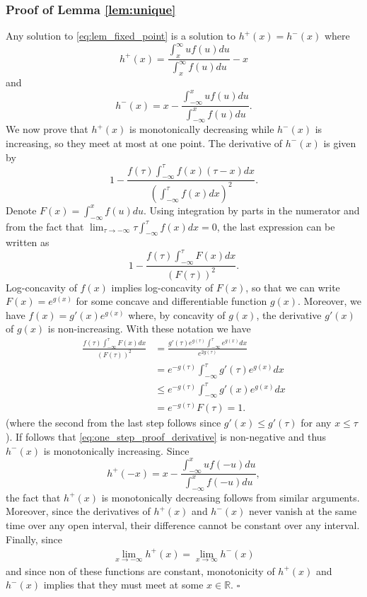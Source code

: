 \documentclass[letterpaper, conference]{IEEEtran}      %
\newcommand*{\QEDA}{\hfill\ensuremath{\square}}
\begin{document}
\subsubsection*{Proof of Lemma \ref{lem:unique}} 
Any solution to \eqref{eq:lem_fixed_point} is a solution to $h^+(x) = h^-(x)$ where
\[
h^+(x) = \frac{\int_x^\infty uf(u)du}{\int_x^\infty f(u)du} - x 
\]
and
\[
h^-(x) = x - \frac{\int_{-\infty}^x uf(u)du}{\int_{-\infty}^x f(u)du}.
\]
We now prove that $h^+(x)$ is monotonically decreasing while $h^-(x)$ is increasing, so they meet at most at one point. The derivative of $h^-(x)$ is given by
\begin{equation} 
\label{eq:one_step_proof_derivative}
1 - \frac{ f(\tau) \int_{-\infty}^\tau f(x) (\tau-x)dx } {\left( \int_{-\infty}^\tau f(x) dx \right)^2}.
\end{equation}
Denote $F(x) = \int_{-\infty}^x f(u)du$. Using integration by parts in the numerator and from the fact that $\lim_{\tau \rightarrow -\infty}  \tau \int_{-\infty}^\tau f(x) dx = 0$, the last expression can be written as
\[
1- \frac{ f(\tau) \int_{-\infty}^\tau F(x) dx}
 {\left( F(\tau) \right)^2}.
\]
Log-concavity of $f(x)$ implies log-concavity of $F(x)$, so that we can write $F(x) = e^{g(x)}$ for some concave and differentiable function $g(x)$. Moreover, we have $f(x) = g'(x)e^{g(x)}$ where, by concavity of $g(x)$, the derivative $g'(x)$ of $g(x)$ is non-increasing. With these notation we have
\begin{align*}
\frac{ f(\tau) \int_{-\infty}^\tau F(x) dx}
 {\left( F(\tau) \right)^2} & = \frac{g'(\tau)e^{g(\tau)} \int_{-\infty}^\tau e^{g(x)}dx }{ e^{2g(\tau)} } \\
 & = e^{-g(\tau)} \int_{-\infty}^\tau g'(\tau) e^{g(x)} dx  \\
 & \leq e^{-g(\tau)} \int_{-\infty}^\tau g'(x) e^{g(x)} dx \\
 & = e^{-g(\tau)} F(\tau) = 1.
\end{align*}
(where the second from the last step follows since $g'(x) \leq g'(\tau)$ for any $x\leq \tau$). If follows that \eqref{eq:one_step_proof_derivative} is non-negative and thus $h^-(x)$ is monotonically increasing. Since
\[
h^+(-x) = x - \frac{ \int_{-\infty}^{x} uf(-u)du}{ \int_{-\infty}^x f(-u) du }, 
\]
the fact that $h^+(x)$ is monotonically decreasing follows from similar arguments. Moreover, since the derivatives of $h^+(x)$ and $h^-(x)$ never vanish at the same time over any open interval, their difference cannot be constant over any interval. Finally, since 
\begin{align*}
 \lim_{x\rightarrow -\infty} h^+(x) =  \lim_{x\rightarrow \infty} h^-(x)
\end{align*}
and since non of these functions are constant, monotonicity of $h^+(x)$ and $h^-(x)$ implies that they must meet at some $x\in \mathbb R$. \QEDA
\end{document}
